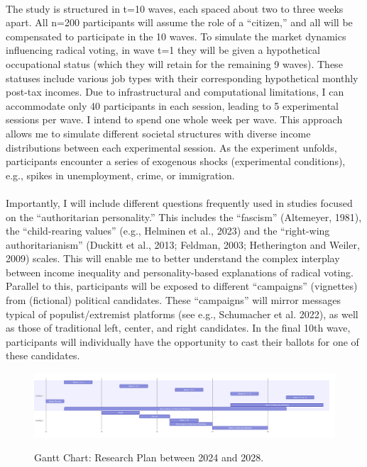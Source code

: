 \documentclass[letterpaper]{article}
\begin{document}
\paragraph{}The study is structured in t=10 waves, each spaced about two to three weeks apart. All n=200 participants will assume the role of a “citizen,” and all will be compensated to participate in the 10 waves. To simulate the market dynamics influencing radical voting, in wave t=1 they will be given a hypothetical occupational status (which they will retain for the remaining 9 waves). These statuses include various job types with their corresponding hypothetical monthly post-tax incomes. Due to infrastructural and computational limitations, I can accommodate only 40 participants in each session, leading to 5 experimental sessions per wave. I intend to spend one whole week per wave. This approach allows me to simulate different societal structures with diverse income distributions between each experimental session.  As the experiment unfolds, participants encounter a series of exogenous shocks (experimental conditions), e.g., spikes in unemployment, crime, or immigration. 

\paragraph{}Importantly, I will include different questions frequently used in studies focused on the “authoritarian personality.” This includes the “fascism” (Altemeyer, 1981), the “child-rearing values” (e.g., Helminen et al., 2023) and the “right-wing authoritarianism” (Duckitt et al., 2013; Feldman, 2003; Hetherington and Weiler, 2009) scales. This will enable me to better understand the complex interplay between income inequality and personality-based explanations of radical voting. Parallel to this, participants will be exposed to different “campaigns” (vignettes) from (fictional) political candidates. These “campaigns” will mirror messages typical of populist/extremist platforms (see e.g., Schumacher et al. 2022), as well as those of traditional left, center, and right candidates. In the final 10th wave, participants will individually have the opportunity to cast their ballots for one of these candidates. 


\begin{figure}[h]
\caption{Gantt Chart: Research Plan between 2024 and 2028.}
\includegraphics[width=\textwidth]{gantt.png} 
\label{fig:1}
\end{figure}

\printbibliography
\end{document}
